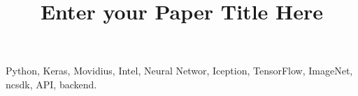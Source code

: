 \documentclass[conference]{IEEEtran}
\begin{document}
	\title{Enter your Paper Title Here}
	\author
	{
	}
	\maketitle
	
	\begin {IEEEkeywords}
		Python, Keras, Movidius, Intel, Neural Networ, Iception, TensorFlow, ImageNet,
		 ncsdk, API, backend.
	\end{IEEEkeywords}
	
	
	
	
	
	
	
	
\end{document}
